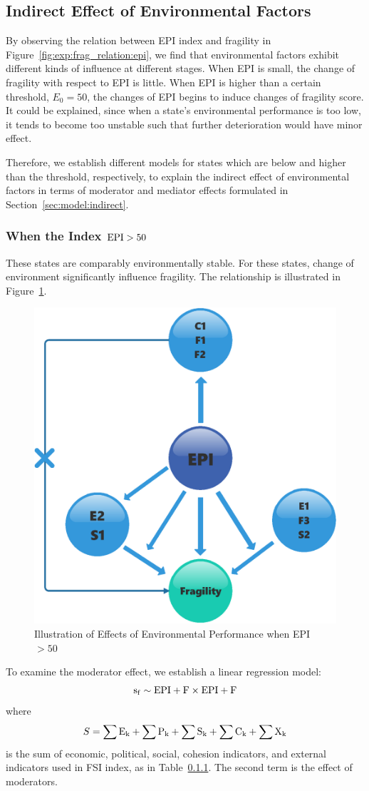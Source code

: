 \subsection{Indirect Effect of Environmental Factors}
By observing the relation between EPI index and fragility in Figure~\ref{fig:exp:frag_relation:epi}, we find that environmental factors exhibit different kinds of influence at different stages. 
When EPI is small, the change of fragility with respect to EPI is little. When EPI is higher than a certain threshold, $E_0=50$, the changes of EPI begins to induce changes of fragility score. It could be explained, since when a state's environmental performance is too low, it tends to become too unstable such that further deterioration would have minor effect.  

Therefore, we establish different models for states which are below and higher than the threshold, respectively, to explain the indirect effect of environmental factors in terms of moderator and mediator effects formulated in Section~\ref{sec:model:indirect}.

\subsubsection{When the Index $\rm{EPI} > 50$}
These states are comparably environmentally stable. For these states, change of environment significantly influence fragility. The relationship is illustrated in Figure~\ref{fig:exp:indirect:case2}.
\begin{figure}[tbp]
    \centering
   \includegraphics[width=.4\linewidth]{figs/larger50.eps} 
   \caption{Illustration of Effects of Environmental Performance when EPI $> 50$}
   \label{fig:exp:indirect:case2}
\end{figure}

To examine the moderator effect, we establish a linear regression model:
\begin{equation}
    \operatorname*{s_f} \sim \rm{EPI} + F \times\rm{EPI}+ F
    \label{eqn:indirect:moderator:reg} 
\end{equation}
where
\begin{equation}
   S= \sum\rm{E}_k + \sum\rm{P}_k + \sum\rm{S}_k + \sum\rm{C}_k + \sum\rm{X}_k
\end{equation}
is the sum of economic, political, social, cohesion indicators, and external indicators used in FSI index, as in Table~\ref{}. 
The second term is the effect of moderators. 

